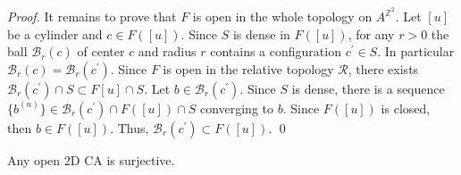 \documentclass{llncs}
\newcommand{\zdu}{\ensuremath{\mathbb{Z}^2}\xspace}
\newcommand{\azdu}{\ensuremath{A^{\zdu}}\xspace}
\begin{document}
\begin{proof}
It remains to prove that $F$ is open in the whole topology on
$\azdu$. Let $[u]$ be a cylinder and $c\in F([u])$. Since $S$ is
dense in $F([u])$, for any $r>0$ the ball $\mathcal{B}_r(c)$ of
center $c$ and radius $r$ contains a configuration $c^\prime\in
S$. In particular $\mathcal{B}_r(c)=\mathcal{B}_r(c^\prime)$.
Since $F$ is open in the relative topology $\mathcal{R}$, there
exists $\mathcal{B}_r(c^\prime)\cap S\subset F[u]\cap S$. Let
$b\in \mathcal{B}_r(c^\prime)$. Since $S$ is dense, there is a
sequence $\{b^{(n)}\}\in \mathcal{B}_r(c^\prime)\cap F([u])\cap S$
converging to $b$. Since $F([u])$ is closed, then $b\in F([u])$.
Thus, $\mathcal{B}_r(c^\prime)\subset F([u])$. \qed
\end{proof}
\begin{proposition}
   Any open 2D CA is surjective.
\end{proposition}
\end{document}
